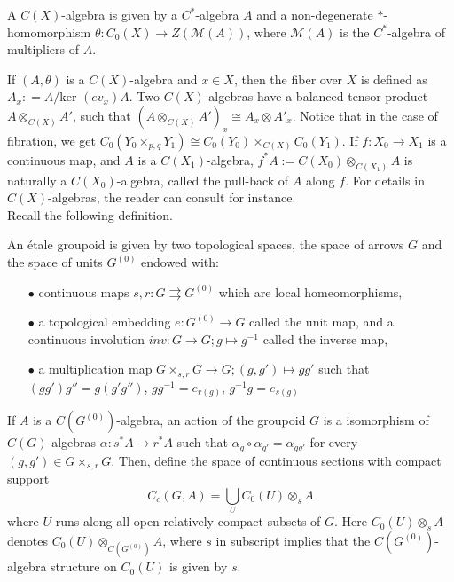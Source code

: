 \begin{definition}
A $C(X)$-algebra is given by a $C^*$-algebra $A$ and a non-degenerate $*$-homomorphism $\theta : C_0(X) \rightarrow Z(\mathcal M(A))$, where $\mathcal M(A)$ is the $C^*$-algebra of multipliers of $A$.
\end{definition}

If $(A,\theta)$ is a $C(X)$-algebra and $x\in X$, then the fiber over $X$ is defined as $A_x : = A/ \text{ker }(ev_x)A$. Two $C(X)$-algebras have a balanced tensor product $A\otimes_{C(X)} A'$, such that $(A\otimes_{C(X)} A')_x \cong A_x\otimes A'_x$. Notice that in the case of fibration, we get $C_0(Y_0\times_{p,q}Y_1) \cong C_0(Y_0)\times_{C(X)}C_0(Y_1)$. If $f:X_0 \rightarrow X_1$ is a continuous map, and $A$ is a $C(X_1)$-algebra, $f^* A :=C(X_0)\otimes_{C(X_1)} A$ is naturally a $C(X_0)$-algebra, called the pull-back of $A$ along $f$. For details in $C(X)$-algebras, the reader can consult \cite{blanchard} for instance. 
\\

Recall the following definition.

\begin{definition}
An étale groupoid is given by two topological spaces, the space of arrows $G$ and the space of units $G^{(0)}$ endowed with:
\begin{itemize}
\item[$\bullet$] continuous maps $s,r : G \rightrightarrows G^{(0)}$ which are local homeomorphisms,
\item[$\bullet$] a topological embedding $e: G^{(0)}\rightarrow G$ called the unit map, and a continuous involution $inv : G\rightarrow G; g\mapsto g^{-1}$ called the inverse map,
\item[$\bullet$] a multiplication map $G\times_{s,r}G\rightarrow G; (g,g')\mapsto gg'$ such that $(gg')g'' = g(g'g'')$, $gg^{-1}= e_{r(g)}$, $g^{-1}g= e_{s(g)}$
\end{itemize}
\end{definition}

If $A$ is a $C(G^{(0)})$-algebra, an action of the groupoid $G$ is a isomorphism of $C(G)$-algebras $\alpha : s^* A \rightarrow r^* A$ such that $\alpha_g \circ \alpha_{g'} = \alpha_{gg'}$ for every $(g,g')\in G\times_{s,r} G$. Then, define the space of continuous sections with compact support 
\[C_c(G,A) = \bigcup_{U} C_0(U)\otimes_s A\]
where $U$ runs along all open relatively compact subsets of $G$. Here $C_0(U)\otimes_s A$ denotes $C_0(U)\otimes_{C(G^{(0)})} A$, where $s$ in subscript implies that the $C(G^{(0)})$-algebra structure on $C_0(U)$ is given by $s$.\\

